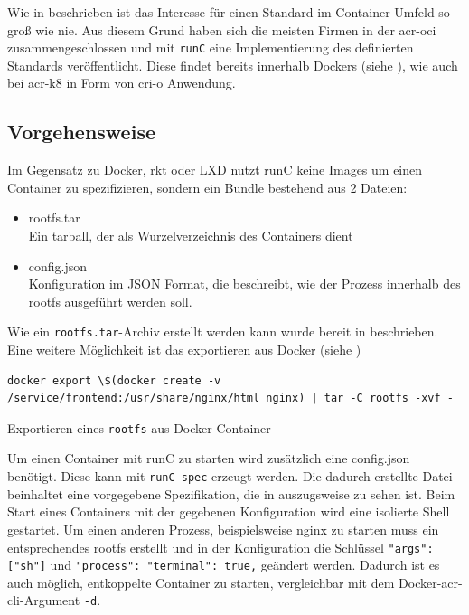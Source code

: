 Wie in  beschrieben ist das Interesse für einen Standard im Container-Umfeld so groß wie nie. Aus diesem Grund haben sich die meisten Firmen in der \gls{acr-oci} zusammengeschlossen und mit \texttt{runC} eine Implementierung des definierten Standards veröffentlicht. Diese findet bereits innerhalb Dockers (siehe ), wie auch bei \gls{acr-k8} in Form von cri-o Anwendung.

\subsection{Vorgehensweise}
\label{sec:comprunCVorgehen}

Im Gegensatz zu Docker, rkt oder LXD nutzt runC keine Images um einen Container zu spezifizieren, sondern ein Bundle bestehend aus 2 Dateien:
\begin{itemize}
	\item rootfs.tar \\
	Ein tarball, der als Wurzelverzeichnis des Containers dient
	\item config.json \\
	Konfiguration im JSON Format, die beschreibt, wie der Prozess innerhalb des rootfs ausgeführt werden soll.
\end{itemize}

Wie ein \texttt{rootfs.tar}-Archiv erstellt werden kann wurde bereit in  beschrieben. Eine weitere Möglichkeit ist das exportieren aus Docker (siehe )

\begin{listing}[h]
	\begin{verbatim}
docker export \$(docker create -v /service/frontend:/usr/share/nginx/html nginx) | tar -C rootfs -xvf -
	\end{verbatim}
	\caption{Exportieren eines \texttt{rootfs} aus Docker Container}
	\label{lst:dockerExport}
\end{listing}

Um einen Container mit runC zu starten wird zusätzlich eine config.json benötigt. Diese kann mit \texttt{runC spec} erzeugt werden. Die dadurch erstellte Datei beinhaltet eine vorgegebene Spezifikation, die in  auszugsweise zu sehen ist. Beim Start eines Containers mit der gegebenen Konfiguration wird eine isolierte Shell gestartet. Um einen anderen Prozess, beispielsweise nginx zu starten muss ein entsprechendes rootfs erstellt und in der Konfiguration die Schlüssel \texttt{{"args": ["sh"]}} und \texttt{{"process": {"terminal": true,}}} geändert werden. Dadurch ist es auch möglich, entkoppelte Container zu starten, vergleichbar mit dem Docker-\gls{acr-cli}-Argument \texttt{-d}. 

